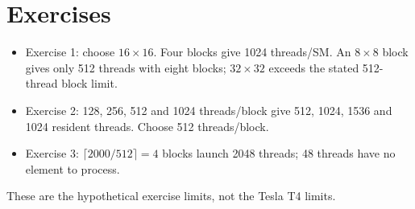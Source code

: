 \documentclass{article}
\begin{document}
\section{Exercises}
\begin{itemize}\setlength{\itemsep}{0pt}
\item Exercise 1: choose $16\times16$. Four blocks give 1024 threads/SM. An $8\times8$ block gives only 512 threads with eight blocks; $32\times32$ exceeds the stated 512-thread block limit.
\item Exercise 2: 128, 256, 512 and 1024 threads/block give 512, 1024, 1536 and 1024 resident threads. Choose 512 threads/block.
\item Exercise 3: $\lceil2000/512\rceil=4$ blocks launch 2048 threads; 48 threads have no element to process.
\end{itemize}
These are the hypothetical exercise limits, not the Tesla T4 limits.
\end{document}
